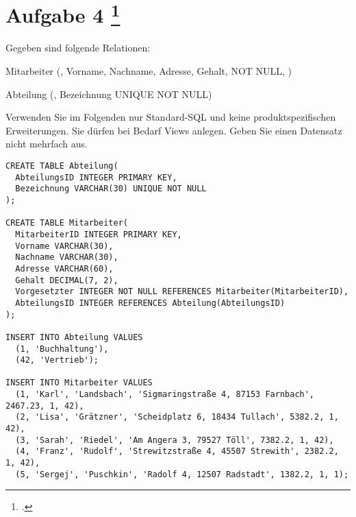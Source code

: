 \documentclass{lehramt-informatik-aufgabe}
\begin{document}
\section{Aufgabe 4
\footcite{66116:2021:03}}

Gegeben sind folgende Relationen:

\begin{liRmodell}
Mitarbeiter (, Vorname, Nachname, Adresse,
Gehalt,  NOT NULL, )

\bigskip

Abteilung (, Bezeichnung UNIQUE NOT NULL)
\end{liRmodell}

Verwenden Sie im Folgenden nur Standard-SQL und keine
produktspezifischen Erweiterungen. Sie dürfen bei Bedarf Views anlegen.
Geben Sie einen Datensatz nicht mehrfach aus.

\begin{verbatim}
CREATE TABLE Abteilung(
  AbteilungsID INTEGER PRIMARY KEY,
  Bezeichnung VARCHAR(30) UNIQUE NOT NULL
);

CREATE TABLE Mitarbeiter(
  MitarbeiterID INTEGER PRIMARY KEY,
  Vorname VARCHAR(30),
  Nachname VARCHAR(30),
  Adresse VARCHAR(60),
  Gehalt DECIMAL(7, 2),
  Vorgesetzter INTEGER NOT NULL REFERENCES Mitarbeiter(MitarbeiterID),
  AbteilungsID INTEGER REFERENCES Abteilung(AbteilungsID)
);

INSERT INTO Abteilung VALUES
  (1, 'Buchhaltung'),
  (42, 'Vertrieb');

INSERT INTO Mitarbeiter VALUES
  (1, 'Karl', 'Landsbach', 'Sigmaringstraße 4, 87153 Farnbach', 2467.23, 1, 42),
  (2, 'Lisa', 'Grätzner', 'Scheidplatz 6, 18434 Tullach', 5382.2, 1, 42),
  (3, 'Sarah', 'Riedel', 'Am Angera 3, 79527 Töll', 7382.2, 1, 42),
  (4, 'Franz', 'Rudolf', 'Strewitzstraße 4, 45507 Strewith', 2382.2, 1, 42),
  (5, 'Sergej', 'Puschkin', 'Radolf 4, 12507 Radstadt', 1382.2, 1, 1);

\end{verbatim}
\end{document}
